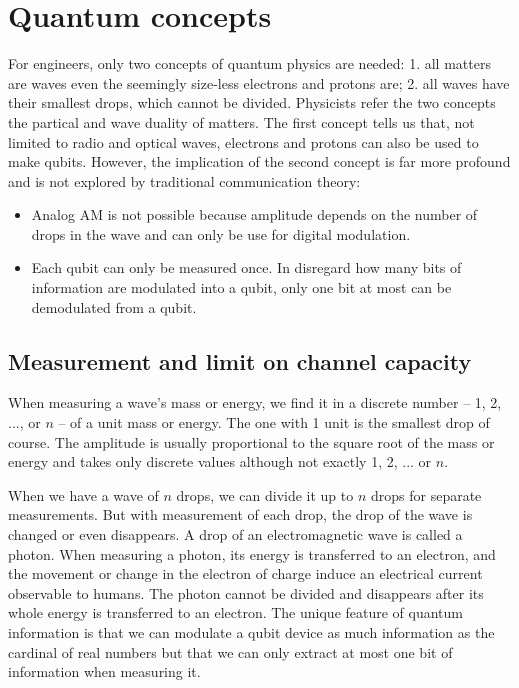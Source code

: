 \documentclass{book}
\begin{document}
\section{Quantum concepts}
For engineers, only two concepts of quantum physics are needed: 1. all matters are waves even the seemingly size-less electrons and protons are; 2. all waves have their smallest drops, which cannot be divided. Physicists refer the two concepts the partical and wave duality of matters. The first concept tells us that, not limited to radio and optical waves, electrons and protons can also be used to make qubits. However, the implication of the second concept is far more profound and is not explored by traditional communication theory:

\begin{itemize}
    \item Analog AM is not possible because amplitude depends on the number of drops in the wave and can only be use for digital modulation. 
    \item Each qubit can only be measured once. In disregard how many bits of information are modulated into a qubit, only one bit at most can be demodulated from a qubit.
\end{itemize}

\subsection{Measurement and limit on channel capacity}
When measuring a wave's mass or energy, we find it in a discrete number -- 1, 2, ..., or $n$ -- of a unit mass or energy. The one with 1 unit is the smallest drop of course. The amplitude is usually proportional to the square root of the mass or energy and takes only discrete values although not exactly 1, 2, ... or $n$.

When we have a wave of $n$ drops, we can divide it up to $n$ drops for separate measurements. But with measurement of each drop, the drop of the wave is changed or even disappears. A drop of an electromagnetic wave is called a photon. When measuring a photon, its energy is transferred to an electron, and the movement or change in the electron of charge induce an electrical current observable to humans. The photon cannot be divided and disappears after its whole energy is transferred to an electron. The unique feature of quantum information is that we can modulate a qubit device as much information as the cardinal of real numbers but that we can only extract at most one bit of information when measuring it.
\end{document}
